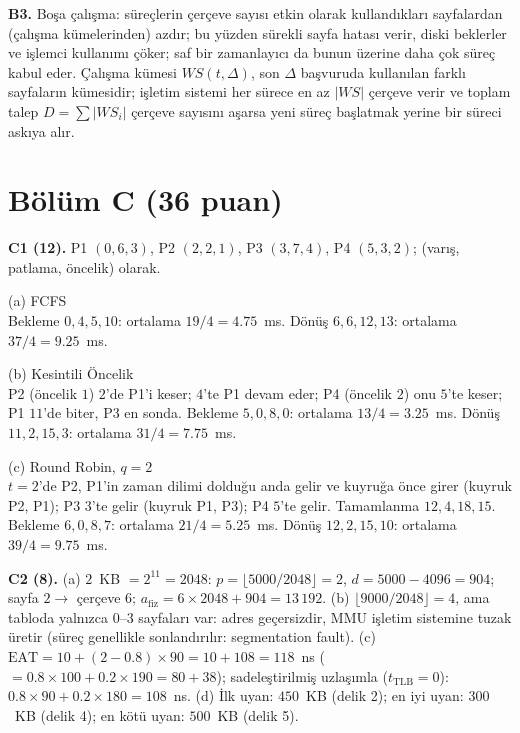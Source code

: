 \documentclass[11pt,a4paper]{article}
\begin{document}
\textbf{B3.} Boşa çalışma: süreçlerin çerçeve sayısı etkin olarak kullandıkları sayfalardan (çalışma kümelerinden) azdır; bu yüzden sürekli sayfa hatası verir, diski beklerler ve işlemci kullanımı çöker; saf bir zamanlayıcı da bunun üzerine daha çok süreç kabul eder. Çalışma kümesi $WS(t,\Delta)$, son $\Delta$ başvuruda kullanılan farklı sayfaların kümesidir; işletim sistemi her sürece en az $|WS|$ çerçeve verir ve toplam talep $D = \sum |WS_i|$ çerçeve sayısını aşarsa yeni süreç başlatmak yerine bir süreci askıya alır.

\section*{Bölüm C (36 puan)}
\textbf{C1 (12).} P1 $(0, 6, 3)$, P2 $(2, 2, 1)$, P3 $(3, 7, 4)$, P4 $(5, 3, 2)$; (varış, patlama, öncelik) olarak.

(a) FCFS\quad{}\\
Bekleme $0, 4, 5, 10$: ortalama $19/4 = 4.75$~ms. Dönüş $6, 6, 12, 13$: ortalama $37/4 = 9.25$~ms.

(b) Kesintili Öncelik\quad{}\\
P2 (öncelik $1$) $2$'de P1'i keser; $4$'te P1 devam eder; P4 (öncelik $2$) onu $5$'te keser; P1 $11$'de biter, P3 en sonda. Bekleme $5, 0, 8, 0$: ortalama $13/4 = 3.25$~ms. Dönüş $11, 2, 15, 3$: ortalama $31/4 = 7.75$~ms.

(c) Round Robin, $q=2$\quad{}\\
$t=2$'de P2, P1'in zaman dilimi dolduğu anda gelir ve kuyruğa önce girer (kuyruk P2, P1); P3 $3$'te gelir (kuyruk P1, P3); P4 $5$'te gelir. Tamamlanma $12, 4, 18, 15$. Bekleme $6, 0, 8, 7$: ortalama $21/4 = 5.25$~ms. Dönüş $12, 2, 15, 10$: ortalama $39/4 = 9.75$~ms.

\textbf{C2 (8).} (a) $2$~KB $= 2^{11} = 2048$: $p = \lfloor 5000/2048 \rfloor = 2$, $d = 5000 - 4096 = 904$; sayfa $2 \to$ çerçeve $6$; $a_{\text{fiz}} = 6 \times 2048 + 904 = 13\,192$. (b) $\lfloor 9000/2048 \rfloor = 4$, ama tabloda yalnızca $0$--$3$ sayfaları var: adres geçersizdir, MMU işletim sistemine tuzak üretir (süreç genellikle sonlandırılır: segmentation fault). (c) $\text{EAT} = 10 + (2 - 0.8) \times 90 = 10 + 108 = 118$~ns ($= 0.8 \times 100 + 0.2 \times 190 = 80 + 38$); sadeleştirilmiş uzlaşımla ($t_{\text{TLB}}=0$): $0.8 \times 90 + 0.2 \times 180 = 108$~ns. (d) İlk uyan: $450$~KB (delik 2); en iyi uyan: $300$~KB (delik 4); en kötü uyan: $500$~KB (delik 5).
\end{document}
